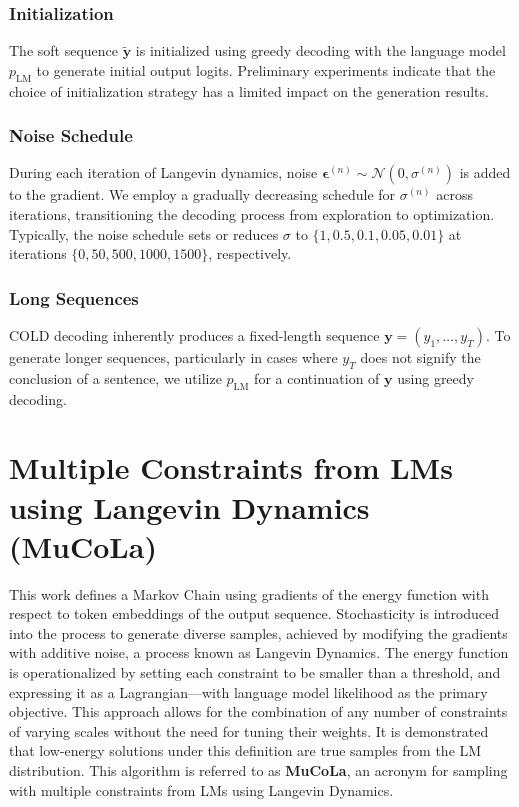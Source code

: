 \documentclass{article}
\begin{document}
\subsubsection*{Initialization}
The soft sequence \(\mathbf{\tilde{y}}\) is initialized using greedy decoding with the language model \(p_{\text{LM}}\) to generate initial output logits. Preliminary experiments indicate that the choice of initialization strategy has a limited impact on the generation results.

\subsubsection*{Noise Schedule}
During each iteration of Langevin dynamics, noise \(\boldsymbol{\epsilon}^{(n)} \sim \mathcal{N}(0, \sigma^{(n)})\) is added to the gradient. We employ a gradually decreasing schedule for \(\sigma^{(n)}\) across iterations, transitioning the decoding process from exploration to optimization. Typically, the noise schedule sets or reduces \(\sigma\) to \(\{1, 0.5, 0.1, 0.05, 0.01\}\) at iterations \(\{0, 50, 500, 1000, 1500\}\), respectively.

\subsubsection*{Long Sequences}
COLD decoding inherently produces a fixed-length sequence \(\mathbf{y} = (y_1, \ldots, y_T)\). To generate longer sequences, particularly in cases where \(y_T\) does not signify the conclusion of a sentence, we utilize \(p_{\text{LM}}\) for a continuation of \(\mathbf{y}\) using greedy decoding.





\section{Multiple Constraints from LMs using Langevin Dynamics (MuCoLa)} \cite[]{mucola}
This work defines a Markov Chain using gradients of the energy function with respect to token embeddings of the output sequence. Stochasticity is introduced into the process to generate diverse samples, achieved by modifying the gradients with additive noise, a process known as Langevin Dynamics. The energy function is operationalized by setting each constraint to be smaller than a threshold, and expressing it as a Lagrangian—with language model likelihood as the primary objective. This approach allows for the combination of any number of constraints of varying scales without the need for tuning their weights. It is demonstrated that low-energy solutions under this definition are true samples from the LM distribution. This algorithm is referred to as \textbf{MuCoLa}, an acronym for sampling with multiple constraints from LMs using Langevin Dynamics.
\end{document}
